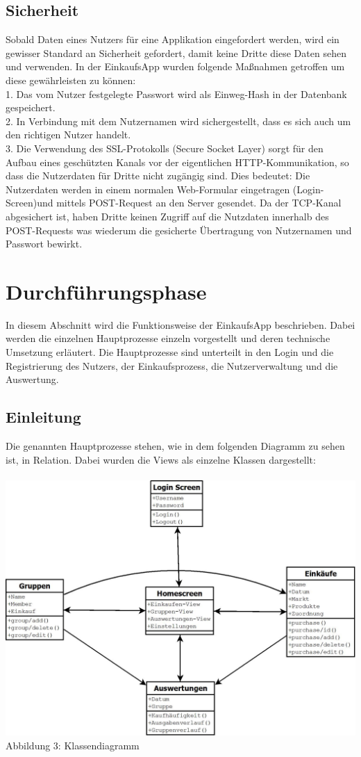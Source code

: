 \documentclass[12pt,a4paper]{article}
\begin{document}
\subsection{Sicherheit}
Sobald Daten eines Nutzers für eine Applikation eingefordert werden, wird ein gewisser Standard an Sicherheit gefordert, damit keine Dritte diese Daten sehen und verwenden.
In der EinkaufsApp wurden folgende Maßnahmen getroffen um diese gewährleisten zu können:
\\
1. Das vom Nutzer festgelegte Passwort wird als Einweg-Hash in der Datenbank gespeichert.
\\ 
2. In Verbindung mit dem Nutzernamen wird sichergestellt, dass es sich auch um den richtigen Nutzer handelt.
\\
3. Die Verwendung des SSL-Protokolls (Secure Socket Layer) sorgt für  den Aufbau eines geschützten Kanals vor der eigentlichen HTTP-Kommunikation, so dass die Nutzerdaten für Dritte nicht zugängig sind. 
 Dies bedeutet: Die Nutzerdaten werden in einem normalen Web-Formular eingetragen (Login-Screen)und mittels POST-Request an den Server gesendet. 
 Da der TCP-Kanal abgesichert ist, haben Dritte keinen Zugriff auf die Nutzdaten innerhalb des POST-Requests was wiederum die gesicherte Übertragung von Nutzernamen und Passwort bewirkt.
\newpage
\section{Durchführungsphase}
In diesem Abschnitt wird die Funktionsweise der EinkaufsApp beschrieben. Dabei werden die einzelnen Hauptprozesse einzeln vorgestellt und deren technische Umsetzung erläutert. Die Hauptprozesse sind unterteilt in den Login und die Registrierung des Nutzers, der Einkaufsprozess, die Nutzerverwaltung und die Auswertung. 
\subsection*{Einleitung}
Die genannten Hauptprozesse stehen, wie in dem folgenden Diagramm zu sehen ist, in Relation. Dabei wurden die Views als einzelne Klassen dargestellt:
\\
\\
\includegraphics[scale=0.4, origin=l]{Klassen-UML.jpeg}
\\
\footnotesize Abbildung 3: Klassendiagramm
\normalsize
\end{document}
